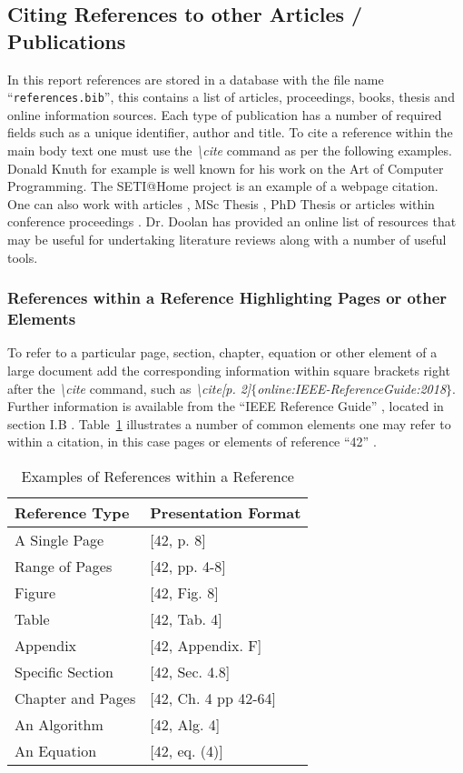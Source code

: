 \subsection{Citing References to other Articles / Publications}
In this report references are stored in a database with the file name ``{\tt references.bib}'', this contains a list of articles, proceedings, books, thesis and online information sources. Each type of publication has a number of required fields such as a unique identifier, author and title. To cite a reference within the main body text one must use the \emph{\textbackslash cite} command as per the following examples. Donald Knuth \cite{book:knuth_1973} for example is well known for his work on the Art of Computer Programming. The SETI@Home project \cite{online:berkeleyBOINC} is an example of a webpage citation. One can also work with articles \cite{art:Russell:1978:Cray1}, MSc Thesis \cite{msc:Shannon:1940}, PhD Thesis \cite{phd:Sutherland:1963} or articles within conference proceedings \cite{proc:Ewald:1978:HPG}. Dr. Doolan \cite{online:Doolan:2016:AcademicResources} has provided an online list of resources that may be useful for undertaking literature reviews along with a number of useful \latex tools. 

\subsubsection{References within a Reference Highlighting Pages or other Elements}
To refer to a particular page, section, chapter, equation or other element of a large document add the corresponding information within square brackets right after the \emph{\textbackslash cite} command, such as \emph{\textbackslash cite[p. 2]$\{$online:IEEE-ReferenceGuide:2018$\}$}. Further information is available from the ``IEEE Reference Guide'' \cite[p.3]{online:IEEE-ReferenceGuide:2018}, located in section I.B \cite[Sec I.B]{online:IEEE-ReferenceGuide:2018}. Table~\ref{tab:ReferenceExamples} illustrates a number of common elements one may refer to within a citation, in this case pages or elements of reference ``42'' \cite[Ch. 27]{book:Adams:1979}.

\begin{table}[H]
\caption{Examples of References within a Reference}\label{tab:ReferenceExamples}
\centering
\small
\begin{tabular}{ll}
\toprule \textbf{Reference Type}& \textbf{Presentation Format}\\
\midrule
A Single Page & [42, p. 8] \\
Range of Pages & [42, pp. 4-8] \\
Figure & [42, Fig. 8] \\
Table & [42, Tab. 4] \\
Appendix & [42, Appendix. F] \\
Specific Section & [42, Sec. 4.8] \\
Chapter and Pages & [42, Ch. 4 pp 42-64] \\
An Algorithm & [42, Alg. 4] \\
An Equation & [42, eq. (4)] \\
\bottomrule
\end{tabular}
\end{table}


